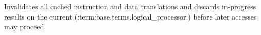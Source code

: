 Invalidates all cached instruction and data translations and discards in-progress results on the current (:term:base.terms.logical_processor:) before later accesses may proceed.
